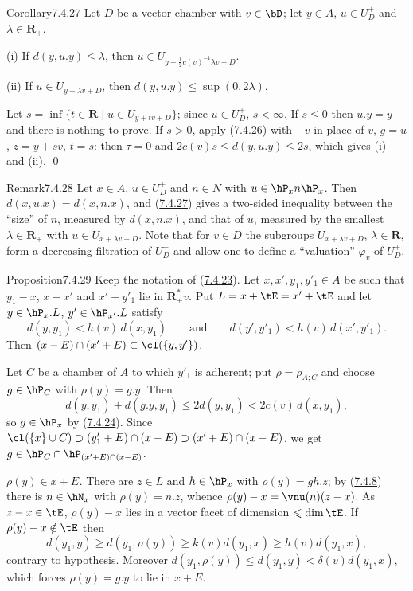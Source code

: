 \documentclass[12pt,a4paper,oneside,english]{smfart}
\makeatletter
\newcommand{\btanchor}[1]{\leavevmode\Hy@raisedlink{\hypertarget{bt:#1}{}}}
\newcommand{\btref}[1]{\hyperlink{bt:#1}{#1}}
\theoremstyle{definition}
\theoremstyle{bt}
\makeatother
\begin{document}
\begin{stmt}{Corollary}{7.4.27}\btanchor{7.4.27}
Let $D$ be a vector chamber with $v\in\bD$; let $y\in A$, $u\in U_D^{+}$ and
$\lambda\in\mathbf{R}_{+}$.

(i) If $d(y,u.y)\leqslant\lambda$, then $u\in U_{y+\frac12c(v)^{-1}\lambda v+D}$.

(ii) If $u\in U_{y+\lambda v+D}$, then $d(y,u.y)\leqslant\sup(0,2\lambda)$.
\end{stmt}

\pf Let $s=\inf\{t\in\mathbf{R}\mid u\in U_{y+tv+D}\}$; since $u\in U_D^{+}$,
$s<\infty$. If $s\leqslant0$ then $u.y=y$ and there is nothing to prove. If $s>0$,
apply (\btref{7.4.26}) with $-v$ in place of $v$, $g=u$, $z=y+sv$, $t=s$: then $\tau=0$ and
$2c(v)s\leqslant d(y,u.y)\leqslant2s$, which gives (i) and (ii). \qed

\begin{stmt}{Remark}{7.4.28}\btanchor{7.4.28}
Let $x\in A$, $u\in U_D^{+}$ and $n\in N$ with $u\in\hP_xn\hP_x$. Then
$d(x,u.x)=d(x,n.x)$, and \textup{(\btref{7.4.27})} gives a two-sided inequality between the
``size'' of $n$, measured by $d(x,n.x)$, and that of $u$, measured by the smallest
$\lambda\in\mathbf{R}_{+}$ with $u\in U_{x+\lambda v+D}$. Note that for $v\in D$ the
subgroups $U_{x+\lambda v+D}$, $\lambda\in\mathbf{R}$, form a decreasing filtration
of $U_D^{+}$ and allow one to define a ``valuation'' $\varphi_v$ of $U_D^{+}$.
\end{stmt}

\begin{stmt}{Proposition}{7.4.29}\btanchor{7.4.29}
Keep the notation of \textup{(\btref{7.4.23})}. Let $x,x',y_1,y'_1\in A$ be such that
$y_1-x$, $x-x'$ and $x'-y'_1$ lie in $\mathbf{R}^{*}_{+}v$. Put
$L=x+\tE=x'+\tE$ and let $y\in\hP_x.L$, $y'\in\hP_{x'}.L$ satisfy
\[
  d(y,y_1)<h(v)\,d(x,y_1)\qquad\text{and}\qquad d(y',y'_1)<h(v)\,d(x',y'_1).
\]
Then $(x-E)\cap(x'+E)\subset\cl(\{y,y'\})$.
\end{stmt}

\pf Let $C$ be a chamber of $A$ to which $y'_1$ is adherent; put $\rho=\rho_{A;C}$
and choose $g\in\hP_C$ with $\rho(y)=g.y$. Then
\[
  d(y,y_1)+d(g.y,y_1)\leqslant2d(y,y_1)<2c(v)\,d(x,y_1),
\]
so $g\in\hP_x$ by (\btref{7.4.24}). Since
$\cl(\{x\}\cup C)\supset(y'_1+E)\cap(x-E)\supset(x'+E)\cap(x-E)$, we get
$g\in\hP_C\cap\hP_{(x'+E)\cap(x-E)}$.

\emph{$\rho(y)\in x+E$.} There are $z\in L$ and $h\in\hP_x$ with $\rho(y)=gh.z$; by
(\btref{7.4.8}) there is $n\in\hN_x$ with $\rho(y)=n.z$, whence
$\rho(y)-x=\vnu(n)(z-x)$. As $z-x\in\tE$, $\rho(y)-x$ lies in a vector facet of
dimension $\leqslant\dim\tE$. If $\rho(y)-x\notin\tE$ then
\[
  d(y_1,y)\geqslant d(y_1,\rho(y))\geqslant k(v)d(y_1,x)\geqslant h(v)d(y_1,x),
\]
contrary to hypothesis. Moreover
$d(y_1,\rho(y))\leqslant d(y_1,y)<\delta(v)d(y_1,x)$, which forces $\rho(y)=g.y$ to
lie in $x+E$.
\end{document}
